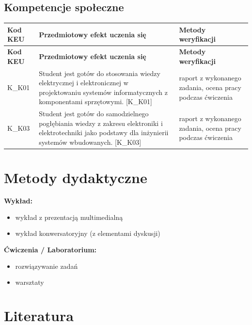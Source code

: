 \documentclass[12pt, a4paper]{article}
\newcommand{\thdrule}{\noalign{\global\setlength{\extrarowheight}{0pt}}}
\newcommand{\thdend}{\noalign{\global\setlength{\extrarowheight}{3pt}}}
\begin{document}
\subsection*{Kompetencje społeczne}
{\scriptsize
\begin{longtable}{m{1.6cm}m{9.0cm}m{4.2cm}}
\thdrule\toprule
\rowcolor{pjatkRed} {\color{white}\footnotesize\textbf{\vphantom{Ag}Kod KEU}} & {\color{white}\footnotesize\textbf{\vphantom{Ag}Przedmiotowy efekt uczenia się}} & {\color{white}\footnotesize\textbf{\vphantom{Ag}Metody weryfikacji}} \\
\midrule\thdend
\endfirsthead
\thdrule\toprule
\rowcolor{pjatkRed} {\color{white}\footnotesize\textbf{\vphantom{Ag}Kod KEU}} & {\color{white}\footnotesize\textbf{\vphantom{Ag}Przedmiotowy efekt uczenia się}} & {\color{white}\footnotesize\textbf{\vphantom{Ag}Metody weryfikacji}} \\
\midrule\thdend
\endhead
  \rowcolor{tableRowLight} K\_K01 & Student jest gotów do stosowania wiedzy elektrycznej i elektronicznej w projektowaniu systemów informatycznych z komponentami sprzętowymi. {[}K\_K01{]} & raport z wykonanego zadania, ocena pracy podczas ćwiczenia \\
  \rowcolor{tableRowAlt} K\_K03 & Student jest gotów do samodzielnego pogłębiania wiedzy z zakresu elektroniki i elektrotechniki jako podstawy dla inżynierii systemów wbudowanych. {[}K\_K03{]} & raport z wykonanego zadania, ocena pracy podczas ćwiczenia \\
\bottomrule
\end{longtable}}

\section{Metody dydaktyczne}

\textbf{Wykład:}
\begin{itemize}
  \item wykład z prezentacją multimedialną
  \item wykład konwersatoryjny (z elementami dyskusji)
\end{itemize}
\vspace{4pt}
\textbf{Ćwiczenia / Laboratorium:}
\begin{itemize}
  \item rozwiązywanie zadań
  \item warsztaty
\end{itemize}
\vspace{4pt}


\section{Literatura}
\end{document}
